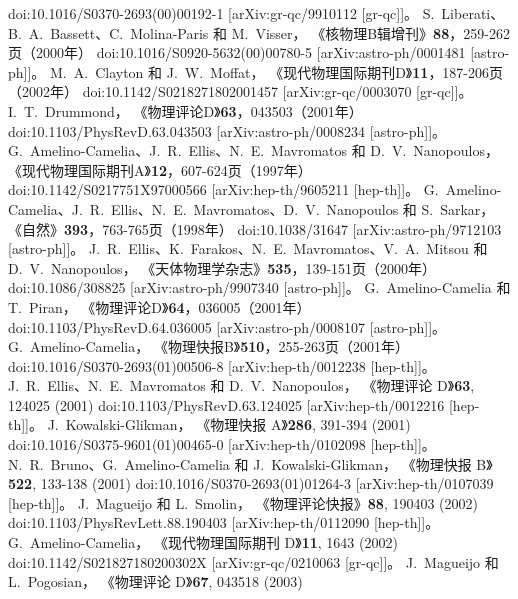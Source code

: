 \documentclass[jkps,preprint,fleqn]{revtex4}
\begin{document}
\begin{thebibliography}{999}
doi:10.1016/S0370-2693(00)00192-1
[arXiv:gr-qc/9910112 [gr-qc]]。
S.~Liberati、B.~A.~Bassett、C.~Molina-Paris 和 M.~Visser，
《核物理B辑增刊》\textbf{88}，259-262页（2000年）
doi:10.1016/S0920-5632(00)00780-5
[arXiv:astro-ph/0001481 [astro-ph]]。
M.~A.~Clayton 和 J.~W.~Moffat，
《现代物理国际期刊D》\textbf{11}，187-206页（2002年）
doi:10.1142/S0218271802001457
[arXiv:gr-qc/0003070 [gr-qc]]。
I.~T.~Drummond，
《物理评论D》\textbf{63}，043503（2001年）
doi:10.1103/PhysRevD.63.043503
[arXiv:astro-ph/0008234 [astro-ph]]。
G.~Amelino-Camelia、J.~R.~Ellis、N.~E.~Mavromatos 和 D.~V.~Nanopoulos，
《现代物理国际期刊A》\textbf{12}，607-624页（1997年）
doi:10.1142/S0217751X97000566
[arXiv:hep-th/9605211 [hep-th]]。
G.~Amelino-Camelia、J.~R.~Ellis、N.~E.~Mavromatos、D.~V.~Nanopoulos 和 S.~Sarkar，
《自然》\textbf{393}，763-765页（1998年）
doi:10.1038/31647
[arXiv:astro-ph/9712103 [astro-ph]]。
J.~R.~Ellis、K.~Farakos、N.~E.~Mavromatos、V.~A.~Mitsou 和 D.~V.~Nanopoulos，
《天体物理学杂志》\textbf{535}，139-151页（2000年）
doi:10.1086/308825
[arXiv:astro-ph/9907340 [astro-ph]]。
G.~Amelino-Camelia 和 T.~Piran，
《物理评论D》\textbf{64}，036005（2001年）
doi:10.1103/PhysRevD.64.036005
[arXiv:astro-ph/0008107 [astro-ph]]。
G.~Amelino-Camelia，
《物理快报B》\textbf{510}，255-263页（2001年）
doi:10.1016/S0370-2693(01)00506-8  
[arXiv:hep-th/0012238 [hep-th]]。  
J.~R.~Ellis、N.~E.~Mavromatos 和 D.~V.~Nanopoulos，  
《物理评论 D》\textbf{63}, 124025 (2001)  
doi:10.1103/PhysRevD.63.124025  
[arXiv:hep-th/0012216 [hep-th]]。  
J.~Kowalski-Glikman，  
《物理快报 A》\textbf{286}, 391-394 (2001)  
doi:10.1016/S0375-9601(01)00465-0  
[arXiv:hep-th/0102098 [hep-th]]。  
N.~R.~Bruno、G.~Amelino-Camelia 和 J.~Kowalski-Glikman，  
《物理快报 B》\textbf{522}, 133-138 (2001)  
doi:10.1016/S0370-2693(01)01264-3  
[arXiv:hep-th/0107039 [hep-th]]。  
J.~Magueijo 和 L.~Smolin，  
《物理评论快报》\textbf{88}, 190403 (2002)  
doi:10.1103/PhysRevLett.88.190403  
[arXiv:hep-th/0112090 [hep-th]]。  
G.~Amelino-Camelia，  
《现代物理国际期刊 D》\textbf{11}, 1643 (2002)  
doi:10.1142/S021827180200302X  
[arXiv:gr-qc/0210063 [gr-qc]]。  
J.~Magueijo 和 L.~Pogosian，  
《物理评论 D》\textbf{67}, 043518 (2003)  

\end{thebibliography}
\end{document}
